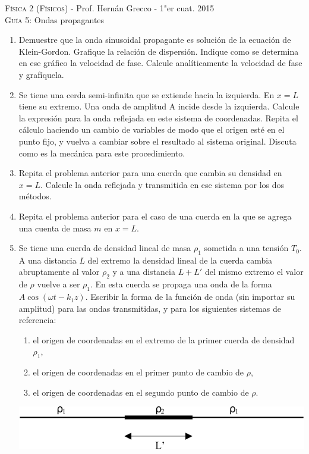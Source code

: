 \documentclass[11pt,spanish,a4paper]{article}
\begin{document}
\begin{center}
	\textsc{\large Física 2 (Físicos)} - Prof. Hernán Grecco - 1"er cuat. 2015\\
	\textsc{\large Guía 5:}	Ondas propagantes
\end{center}

\begin{enumerate}
\item Demuestre que la onda sinusoidal propagante es solución de la ecuación de Klein-Gordon.
	Grafique la relación de dispersión.
	Indique como se determina en ese gráfico la velocidad de fase.
	Calcule analíticamente la velocidad de fase y grafíquela.


\item Se tiene una cerda semi-infinita que se extiende hacia la izquierda.
	En \(x=L\) tiene su extremo.
	Una onda de amplitud A incide desde la izquierda.
	Calcule la expresión para la onda reflejada en este sistema de coordenadas.
	Repita el cálculo haciendo un cambio de variables de modo que el origen esté en el punto fijo, y vuelva a cambiar sobre el resultado al sistema original.
	Discuta como es la mecánica para este procedimiento.


\item Repita el problema anterior para una cuerda que cambia su densidad en \(x=L\).
	Calcule la onda reflejada y transmitida en ese sistema por los dos métodos.


\item Repita el problema anterior para el caso de una cuerda en la que se agrega una cuenta de masa \(m\) en \(x=L\).


\item Se tiene una cuerda de densidad lineal de masa \(\rho_1\) sometida a una tensión \(T_0\).
	A una distancia \(L\) del extremo la densidad lineal de la cuerda cambia abruptamente al valor \(\rho_2\) y a una distancia \(L+L'\) del mismo extremo el valor de \(\rho\) vuelve a ser \(\rho_1\).
	En esta cuerda se propaga una onda de la forma \(A \cos{(\omega t- k_1 z)}\).
	Escribir la forma de la función de onda (sin importar su amplitud) para las ondas transmitidas, y para los siguientes sistemas de referencia:
	\begin{enumerate}
		\item el origen de coordenadas en el extremo de la primer cuerda de densidad \(\rho_1\), 
		\item el origen de coordenadas en el primer punto de cambio de \(\rho\), 
		\item el origen de coordenadas en el segundo punto de cambio de \(\rho\).
	\end{enumerate}
\begin{center}
	\includegraphics[width=0.45\linewidth]{g05e05}
\end{center}



\end{enumerate}
\end{document}
